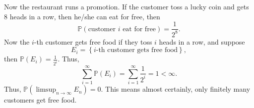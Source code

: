 \begin{eg}
    Now the restaurant runs a promotion. If the customer toss a lucky coin and gets \(8\) heads in a row, then he/she can eat for free, then 
    \[
        \mathbb{P} \left( \text{customer } i \text{ eat for free}   \right) = \frac{1}{2^8}. 
    \]  
    Now the \(i\)-th customer gets free food if they toss \(i\) heads in a row, and suppose 
    \[
        E_i = \left\{ i\text{-th customer gets free food}  \right\}, 
    \]   
    then \(\mathbb{P} (E_i) = \frac{1}{2^i}\). Thus,
    \[
        \sum_{i=1}^{\infty} \mathbb{P} (E_i) = \sum_{i=1}^{\infty} \frac{1}{2^i} = 1 < \infty .  
    \] 
    Thus, \(\mathbb{P} (\limsup_{n \to \infty} E_n ) = 0.\) This means almost certainly, only finitely many customers get free food. 
\end{eg}

